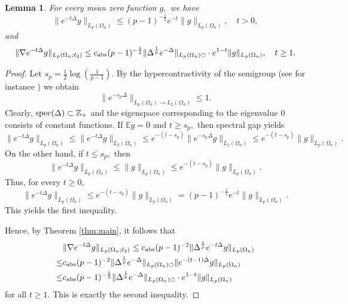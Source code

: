 \documentclass{amsart}
\numberwithin{equation}{section}
\newtheorem{lem}[thm]{Lemma}
\theoremstyle{definition}
\theoremstyle{remark}
\newcommand{\1}{\mathbf 1}
\begin{document}
\begin{lem}\label{exponential decay lemma} For every mean zero function $g,$ we have
$$\|e^{-t\Delta}g\|_{L_p(\Omega_{n})}\leq (p-1)^{-\frac12}e^{-t}\|g\|_{L_p(\Omega_{n})},\quad t>0,$$
and
$$\|\nabla e^{-t\Delta}g\|_{L_p(\Omega_{n};\ell_2)}\leq c_{{\rm abs}}(p-1)^{-\frac52}\|\Delta^{\frac1p}e^{-\Delta}\|_{L_p(\Omega_{n})\circlearrowleft}\cdot e^{1-t}\|g\|_{L_p(\Omega_{n})},\quad t\geq 1.$$
\end{lem}
\begin{proof} Let
$s_p=\frac12\log(\frac{1}{p-1}).$  By the hypercontractivity of the semigroup (see for instance \cite{Beckner1975,Bonami1970,Ne1973}) we obtain
$$
\|e^{-s_p\Delta}\|_{L_p(\Omega_{n})\to L_2(\Omega_{n})}\leq1.
$$
Clearly, ${\rm spec}(\Delta)\subset\mathbb{Z}_+$ and the eigenspace corresponding to the eigenvalue $0$ consists of constant functions. If $\mathbb{E} g=0$ and $t\geq s_p,$ then spectral gap yields
$$\|e^{-t\Delta}g\|_{L_p(\Omega_{n})}\leq\|e^{-t\Delta}g\|_{L_2(\Omega_{n})}\leq e^{-(t-s_p)}\|e^{-s_p\Delta}g\|_{L_2(\Omega_{n})}\leq e^{-(t-s_p)}\|g\|_{L_p(\Omega_{n})}.$$
On the other hand, if $t\leq s_p,$ then
$$\|e^{-t\Delta}g\|_{L_p(\Omega_{n})}\leq\|g\|_{L_p(\Omega_{n})}\leq e^{-(t-s_p)}\|g\|_{L_p(\Omega_{n})}.$$
Thus, for every $t\geq0,$
$$\|e^{-t\Delta}g\|_{L_p(\Omega_{n})}\leq e^{-(t-s_p)}\|g\|_{L_p(\Omega_{n})}=(p-1)^{-\frac12}e^{-t}\|g\|_{L_p(\Omega_{n})}.$$
This yields the first inequality.

Hence, by Theorem \ref{thm:main}, it follows that
\begin{align*}
&\|\nabla e^{-t\Delta}g\|_{L_p(\Omega_{n};\ell_2)}\leq c_{{\rm abs}}(p-1)^{-2}\|\Delta^{\frac1p}e^{-t\Delta}g\|_{L_p(\Omega_{n})}\\
\leq& c_{{\rm abs}}(p-1)^{-2}\|\Delta^{\frac1p}e^{-\Delta}\|_{L_p(\Omega_{n})\circlearrowleft}\|e^{-(t-1)\Delta}g\|_{L_p(\Omega_{n})}\\
\leq & c_{{\rm abs}}(p-1)^{-\frac52}\|\Delta^{\frac1p}e^{-\Delta}\|_{L_p(\Omega_{n})\circlearrowleft}\cdot e^{1-t}\|g\|_{L_p(\Omega_{n})}
\end{align*}
for all $t\geq 1$. This is exactly the second inequality.
\end{proof}
\end{document}
